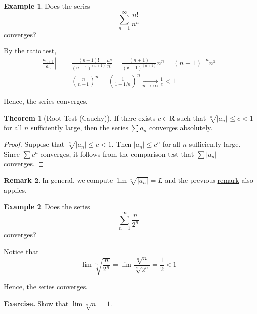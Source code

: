 \documentclass[12pt,a4paper]{article}
\theoremstyle{definition}
\newtheorem{theorem}{Theorem}[section]
\newtheorem{remark}[theorem]{Remark}
\newtheorem{example}{Example}[section]
\begin{document}
\begin{example}
	Does the series \[ \sum_{n=1}^\infty \frac{n!}{n^n} \] converges?
	
	By the ratio test,
	\begin{equation*}
		\begin{aligned}
			\left| \frac{a_{n+1}}{a_n} \right| &= \frac{(n+1)!}{(n+1)^{(n+1)}} \frac{n^n}{n!} = \frac{(n+1)}{(n+1)^{(n+1)}} n^n = (n+1)^{-n} n^n \\
			&= \left( \frac{n}{n+1} \right)^n = \left( \frac{1}{1+1/n} \right)^n \underset{n \to \infty}{\longrightarrow} \frac{1}{e} < 1
		\end{aligned}
	\end{equation*}
	
	Hence, the series converges.
\end{example}

\begin{theorem}[Root Test (Cauchy)]
	If there exists $c \in \textbf{R}$ such that $\sqrt[n]{|a_n|} \leq c < 1$ for all $n$ sufficiently large, then the series $\sum a_n$ converges absolutely.
\end{theorem}

\begin{proof}
	Suppose that $\sqrt[n]{|a_n|} \leq c < 1$. Then $|a_n| \leq c^n$ for all $n$ sufficiently large. Since $\sum c^n$ converges, it follows from the comparison test that $\sum |a_n|$ converges.
\end{proof}

\begin{remark}
	In general, we compute $\lim \sqrt[n]{|a_n|} = L$ and the previous \hyperref[ratiorootremark]{remark} also applies.
\end{remark}

\begin{example}
	Does the series \[ \sum_{n=1}^\infty \frac{n}{2^n} \] converges?
	
	Notice that
	\[
		\lim \sqrt[n]{\frac{n}{2^n}} = \lim \frac{\sqrt[n]{n}}{\sqrt[n]{2^n}} = \frac{1}{2} < 1
	\]
	
	Hence, the series converges.
\end{example}

\textbf{Exercise.} Show that $\lim \sqrt[n]{n} = 1$.

\newpage
\nocite{*}


\end{document}
